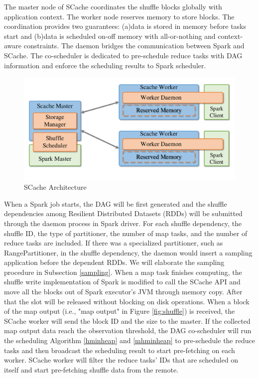 The master node of SCache coordinates the shuffle blocks globally with application context. The worker node reserves memory to store blocks.
The coordination provides two guarantees: (a)data is stored in memory before tasks start and (b)data is scheduled on-off memory with all-or-nothing and context-aware constraints. 
The daemon bridges the communication between Spark and SCache. The co-scheduler is dedicated to pre-schedule reduce tasks with DAG information and enforce the scheduling results to Spark scheduler.
\begin{figure}
	\centering
	\includegraphics[width=0.8\linewidth]{fig/arch}
	\caption{SCache Architecture}
	\label{fig:arch}
	\vspace{-1em}
\end{figure}
When a Spark job starts, the DAG will be first generated and the shuffle dependencies among Resilient Distributed Datasets (RDDs) will be submitted through the daemon process in Spark driver. 
For each shuffle dependency, the shuffle ID, the type of partitioner, the number of map tasks, and the number of reduce tasks are included. 
If there was a specialized partitioner, such as RangePartitioner, in the shuffle dependency, the daemon would insert a sampling application before the dependent RDDs. 
We will elaborate the sampling procedure in Subsection \ref{sampling}.
When a map task finishes computing, the shuffle write implementation of Spark is modified to call the SCache API and move all the blocks out of Spark executor's JVM through memory copy. 
After that the slot will be released without blocking on disk operations.
When a block of the map output (i.e., "map output" in Figure \ref{fig:shuffle}) is received, the SCache worker will send the block ID and the size to the master.
If the collected map output data reach the observation threshold, the DAG co-scheduler will run the scheduling Algorithm \ref{hminheap} and \ref{mhminheap} to pre-schedule the reduce tasks and then broadcast the scheduling result to start pre-fetching on each worker.
SCache worker will filter the reduce tasks' IDs that are scheduled on itself and start pre-fetching shuffle data from the remote. 

